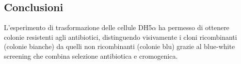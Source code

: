 \subsection{Conclusioni}
L’esperimento di trasformazione delle cellule DH5$\alpha$ ha permesso di ottenere colonie resistenti agli antibiotici, distinguendo visivamente i cloni ricombinanti (colonie bianche) da quelli non ricombinanti (colonie blu) grazie al blue-white screening che combina selezione antibiotica e cromogenica.

\newpage

